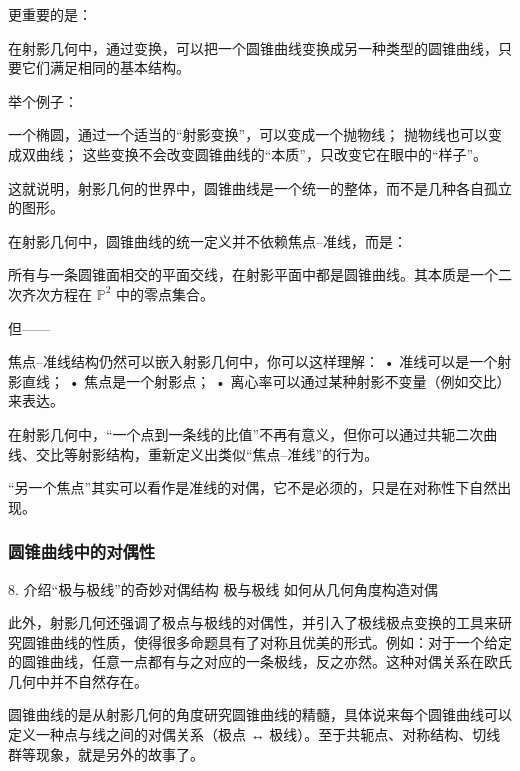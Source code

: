 更重要的是：

在射影几何中，通过变换，可以把一个圆锥曲线变换成另一种类型的圆锥曲线，只要它们满足相同的基本结构。

举个例子：


一个椭圆，通过一个适当的“射影变换”，可以变成一个抛物线；
抛物线也可以变成双曲线；
这些变换不会改变圆锥曲线的“本质”，只改变它在眼中的“样子”。

这就说明，射影几何的世界中，圆锥曲线是一个统一的整体，而不是几种各自孤立的图形。


在射影几何中，圆锥曲线的统一定义并不依赖焦点–准线，而是：

所有与一条圆锥面相交的平面交线，在射影平面中都是圆锥曲线。其本质是一个二次齐次方程在 $\mathbb{P}^2$ 中的零点集合。

但——

焦点–准线结构仍然可以嵌入射影几何中，你可以这样理解：
	•	准线可以是一个射影直线；
	•	焦点是一个射影点；
	•	离心率可以通过某种射影不变量（例如交比）来表达。

在射影几何中，“一个点到一条线的比值”不再有意义，但你可以通过共轭二次曲线、交比等射影结构，重新定义出类似“焦点–准线”的行为。

“另一个焦点”其实可以看作是准线的对偶，它不是必须的，只是在对称性下自然出现。


\subsubsection{圆锥曲线中的对偶性}


	8.	介绍“极与极线”的奇妙对偶结构
极与极线	如何从几何角度构造对偶

此外，射影几何还强调了极点与极线的对偶性，并引入了极线极点变换的工具来研究圆锥曲线的性质，使得很多命题具有了对称且优美的形式。例如：对于一个给定的圆锥曲线，任意一点都有与之对应的一条极线，反之亦然。这种对偶关系在欧氏几何中并不自然存在。

圆锥曲线的是从射影几何的角度研究圆锥曲线的精髓，具体说来每个圆锥曲线可以定义一种点与线之间的对偶关系（极点 ↔ 极线）。至于共轭点、对称结构、切线群等现象，就是另外的故事了。


